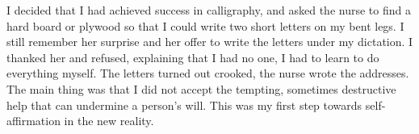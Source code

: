 \label{15-1}
I decided that I had achieved success in calligraphy, and asked the nurse to find a hard board or plywood so that I could write two short letters on my bent legs. I still remember her surprise and her offer to write the letters under my dictation. I thanked her and refused, explaining that I had no one, I had to learn to do everything myself. The letters turned out crooked, the nurse wrote the addresses. The main thing was that I did not accept the tempting, sometimes destructive help that can undermine a person's will. This was my first step towards self-affirmation in the new reality.
